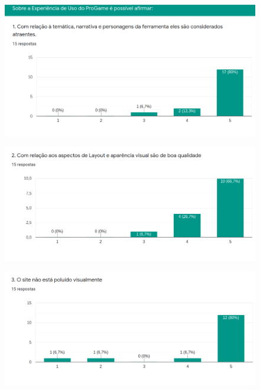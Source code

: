 \begin{apendicesenv}
\begin{figure}[h]
	\centering
	\includegraphics[keepaspectratio=true,scale=0.4]{figuras/1.png}
\end{figure}

\begin{figure}[h]
	\centering
	\includegraphics[keepaspectratio=true,scale=0.4]{figuras/2.png}
\end{figure}

\begin{figure}[h]
	\centering
	\includegraphics[keepaspectratio=true,scale=0.4]{figuras/3.png}
\end{figure}


\end{apendicesenv}
